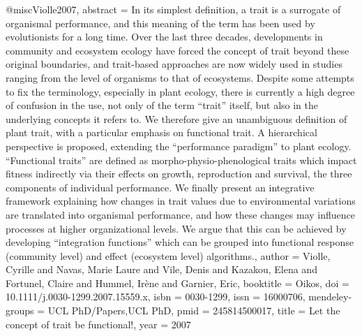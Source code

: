 {{@misc{Violle2007,
abstract = {In its simplest definition, a trait is a surrogate of organismal performance, and this meaning of the term has been used by evolutionists for a long time. Over the last three decades, developments in community and ecosystem ecology have forced the concept of trait beyond these original boundaries, and trait-based approaches are now widely used in studies ranging from the level of organisms to that of ecosystems. Despite some attempts to fix the terminology, especially in plant ecology, there is currently a high degree of confusion in the use, not only of the term “trait” itself, but also in the underlying concepts it refers to. We therefore give an unambiguous definition of plant trait, with a particular emphasis on functional trait. A hierarchical perspective is proposed, extending the “performance paradigm” to plant ecology. “Functional traits” are defined as morpho-physio-phenological traits which impact fitness indirectly via their effects on growth, reproduction and survival, the three components of individual performance. We finally present an integrative framework explaining how changes in trait values due to environmental variations are translated into organismal performance, and how these changes may influence processes at higher organizational levels. We argue that this can be achieved by developing “integration functions” which can be grouped into functional response (community level) and effect (ecosystem level) algorithms.},
author = {Violle, Cyrille and Navas, Marie Laure and Vile, Denis and Kazakou, Elena and Fortunel, Claire and Hummel, Ir{\`{e}}ne and Garnier, Eric},
booktitle = {Oikos},
doi = {10.1111/j.0030-1299.2007.15559.x},
isbn = {0030-1299},
issn = {16000706},
mendeley-groups = {UCL PhD/Papers,UCL PhD},
pmid = {245814500017},
title = {{Let the concept of trait be functional!}},
year = {2007}
}

}}
